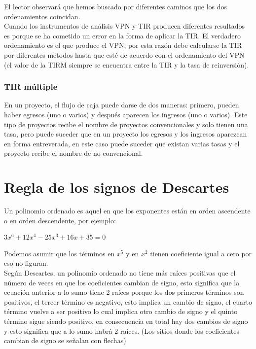 El lector observará que hemos buscado por diferentes caminos que los dos ordenamientos coincidan. \\
Cuando los instrumentos de análisis VPN y TIR producen diferentes resultados es porque se ha cometido un error en la forma de aplicar la TIR. El verdadero ordenamiento es el que produce el VPN, por esta razón debe calcularse la TIR por diferentes métodos hasta que esté de acuerdo con el ordenamiento del VPN (el valor de la TIRM siempre se encuentra entre la TIR y la tasa de reinversión).\\

\subsubsection{TIR múltiple}

En un proyecto, el flujo de caja puede darse de dos maneras: primero, pueden haber egresos (uno o varios) y después aparecen los ingresos (uno o varios). Este tipo de proyectos recibe el nombre de proyectos convencionales y solo tienen una tasa, pero puede suceder que en un proyecto los egresos y los ingresos aparezcan en forma entreverada, en este caso puede suceder que existan varias tasas y el proyecto recibe el nombre de no convencional.

\section{Regla de los signos de Descartes}


Un polinomio ordenado es aquel en que los exponentes están en orden ascendente o en orden descendente, por ejemplo: \\

\begin{center}
	$3x^{6}+12x^{4}-25x^{3}+16x+35=0$
\end{center}

Podemos asumir que los términos en $x^{5}$  y en $x^{2}$ tienen coeficiente igual a cero por eso no figuran. \\

Según Descartes, un polinomio ordenado no tiene más raíces positivas que el número de veces en que los coeficientes cambian de signo, esto significa que la ecuación anterior a lo sumo tiene 2 raíces porque los dos primeros términos son positivos, el tercer término es negativo, esto implica un cambio de signo, el cuarto término vuelve a ser positivo lo cual implica otro cambio de signo y el quinto término sigue siendo positivo, en consecuencia en total hay dos cambios de signo y esto significa que a lo sumo habrá 2 raíces. (Los sitios donde los coeficientes cambian de signo se señalan con flechas)\\

